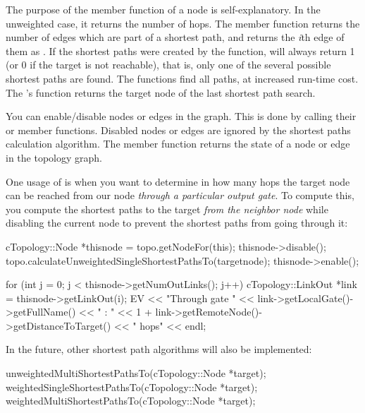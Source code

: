 The purpose of the  member function of a
node is self-explanatory. In the unweighted case, it returns the
number of hops. The  member function returns the number
of edges which are part of a shortest path, and
 returns the \textit{i}th edge of them as
. If the shortest paths were created by the
 function,
 will always return 1 (or 0 if the target is not
reachable), that is, only one of the several possible shortest paths
are found.  The
 functions
find all paths, at increased run-time cost. The 's
 function returns the target node of the last
shortest path search.

You can enable/disable nodes or edges in the graph. This is done by
calling their  or  member functions.
Disabled nodes or edges are ignored by the shortest paths calculation
algorithm. The  member function returns the state of
a node or edge in the topology graph.

One usage of  is when you want to determine in how many
hops the target node can be reached from our node \textit{through
a particular output gate}. To compute this, you compute the
shortest paths to the target \textit{from the neighbor node} while
disabling the current node to prevent the shortest paths
from going through it:

\begin{cpp}
cTopology::Node *thisnode = topo.getNodeFor(this);
thisnode->disable();
topo.calculateUnweightedSingleShortestPathsTo(targetnode);
thisnode->enable();

for (int j = 0; j < thisnode->getNumOutLinks(); j++) {
  cTopology::LinkOut *link = thisnode->getLinkOut(i);
  EV << "Through gate " << link->getLocalGate()->getFullName() << " : "
     << 1 + link->getRemoteNode()->getDistanceToTarget() << " hops" << endl;
}
\end{cpp}

In the future, other shortest path algorithms will also be implemented:

\begin{cpp}
unweightedMultiShortestPathsTo(cTopology::Node *target);
weightedSingleShortestPathsTo(cTopology::Node *target);
weightedMultiShortestPathsTo(cTopology::Node *target);
\end{cpp}



